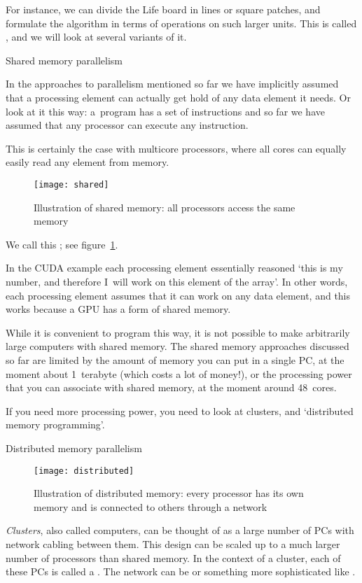 For instance, we can divide the Life board in lines or square patches,
and formulate the algorithm in terms of operations on such larger units.
This is called , and we will look
at several variants of it.

 {Shared memory parallelism}
\label{sec:shared}

In the approaches to parallelism mentioned so far we have 
implicitly assumed that a processing element can actually get hold of any data
element it needs. Or look at it this way: a~program has a set of instructions
and so far we have assumed that any processor can execute any instruction.

This is certainly the case with multicore processors,
where all cores can equally easily read any element from memory.
\begin{figure}[t]
  \texttt{[image: shared]}
  \caption{Illustration of shared memory: all processors access the
    same memory}
  \label{fig:shared}
\end{figure}
We call this ; see figure~\ref{fig:shared}.

In the CUDA example each
processing element essentially reasoned `this is my number, and
therefore I~will work on this element of the array'. 
In other words, each processing element assumes that it can 
work on any data element, and this works
because a GPU has a form of shared memory.

While it is convenient to program this way, it is not possible to make
arbitrarily large computers with shared memory.
The shared memory approaches discussed so far are limited by the
amount of memory you can put in a single PC, at the moment about
1~terabyte (which costs a lot of money!), or the processing power
that you can associate with shared memory, at the moment around
48~cores.

If you need more processing power, you need to look at clusters,
and `distributed memory programming'.

 {Distributed memory parallelism}
\label{sec:spmd}

\begin{figure}[t]
  \texttt{[image: distributed]}
  \caption{Illustration of distributed memory: every processor has its
    own memory and is connected to others through a network}
  \label{fig:spmd}
\end{figure}

\emph{Clusters},
also called  computers,
can be thought of
as a large number of PCs with network cabling between them.
This design can be scaled up to a much larger number of processors
than shared memory.
In the context of a cluster, each of these PCs
is called a . The network can be
 or something more sophisticated like .

